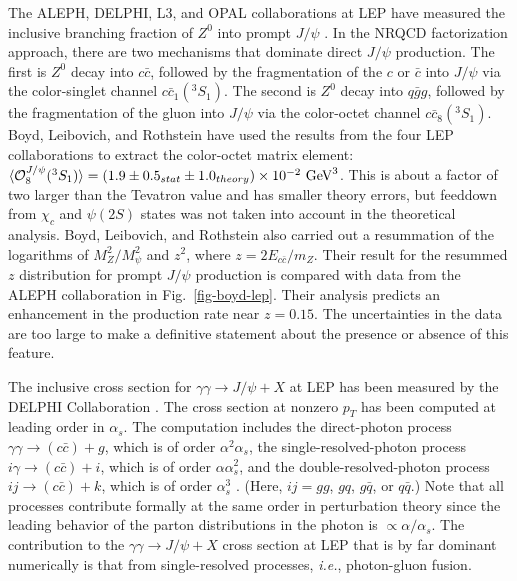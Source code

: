 The ALEPH, DELPHI, L3, and OPAL collaborations at LEP have measured
the inclusive branching fraction of $Z^0$ into prompt $J/\psi$
\cite{ALEPH:1997zj,Abreu:1994rk,Wadhwa:1998mt,Alexander:1996jp}.
In the NRQCD factorization approach, there are two
mechanisms that dominate direct $J/\psi$ production.  The first is
$Z^0$ decay into $c \bar c$, followed by the fragmentation of the $c$
or $\bar c$ into $J/\psi$ via the color-singlet channel $c \bar
c_1({}^3S_1)$. The second is $Z^0$ decay into $q \bar g g$, followed by
the fragmentation of the gluon into $J/\psi$ via the color-octet channel
$c \bar c_8({}^3S_1)$.  Boyd, Leibovich, and Rothstein
\cite{Boyd:1998km} have used the results from the four LEP
collaborations to extract the color-octet matrix element: $\langle{\cal
O}^{J/\psi}_8({}^3S_1) \rangle =(1.9\pm 0.5_{stat}\pm1.0_{theory})
\times 10^{-2}\hbox{ GeV}^3$. This is about a factor of two larger than
the Tevatron value and has smaller theory errors, but feeddown from
$\chi_c$ and $\psi(2S)$ states was not taken into account in the
theoretical analysis. Boyd, Leibovich, and Rothstein \cite{Boyd:1998km}
also carried out a resummation of the logarithms of $M_Z^2/M_\psi^2$ and
$z^2$, where $z = 2E_{c \bar c}/m_Z$. Their result for the resummed $z$
distribution for prompt $J/\psi$ production is compared with
data from the ALEPH collaboration \cite{ALEPH:1997zj} in
Fig.~\ref{fig-boyd-lep}. Their analysis predicts an enhancement in the
production rate near $z=0.15$. The uncertainties in the data are too
large to make a definitive statement about the presence or absence of
this feature.

The inclusive cross section for ${\gamma \gamma\rightarrow J/\psi +X}$
at LEP has been measured by the DELPHI Collaboration
\cite{Todorova-Nova:2001pt,Abdallah:2003du}. The cross section at nonzero
$p_T$ has been computed at leading order in $\alpha_s$. 
The computation includes the direct-photon process 
$\gamma \gamma \to (c \bar c ) + g$, which is of order $\alpha^2 \alpha_s$, 
the single-resolved-photon process $i \gamma \to (c \bar c ) + i$, 
which is of order $\alpha \alpha_s^2$, 
and the double-resolved-photon process $i j \to (c \bar c ) + k$, 
which is of order $\alpha_s^3$
\cite{Ma:1997bi,Japaridze:1998ss,Godbole:2001pj,Klasen:2001mi,Klasen:2001cu}.
(Here, $ij = gg$, $g q$, $g \bar q$, or $q \bar q$.) Note that all
processes contribute formally at the same order in perturbation theory since
the leading behavior of the parton distributions in the photon is
$\propto \alpha/\alpha_s$. The contribution to the 
$\gamma\gamma\rightarrow J/\psi +X$ cross section at LEP
that is by far dominant numerically is that
from single-resolved processes, {\it i.e.}, photon-gluon fusion.

